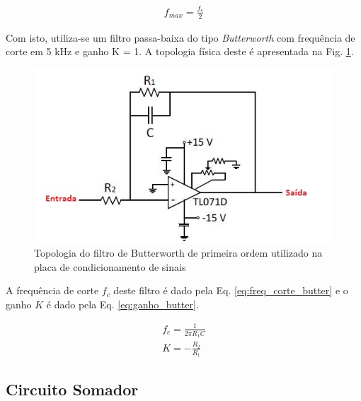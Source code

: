 	\begin{align}
		f_{max} = \frac{f_s}{2}\label{eq:freq_sinal}
	\end{align}

	Com isto, utiliza-se um filtro passa-baixa do tipo \textit{Butterworth} com frequência de corte em 5 kHz e ganho K = 1. A topologia física deste é apresentada na Fig. \ref{fig:filtro-butter}.
	
\begin{figure}[!hbt]
         \begin{center}
         \includegraphics[scale=0.7]{figuras/filtro-butter.JPG}
         \caption{Topologia do filtro de Butterworth de primeira ordem utilizado na placa de condicionamento de sinais}
         \label{fig:filtro-butter}
         \end{center}
 \end{figure}

	A frequência de corte $f_c$ deste filtro é dado pela Eq. \ref{eq:freq_corte_butter} e o ganho $K$ é dado pela Eq. \ref{eq:ganho_butter}.
	
\begin{align}
	f_{c} = \frac{1}{2\pi R_1 C} \label{eq:freq_corte_butter} \\
	K = -\frac{R_2}{R_1}\label{eq:ganho_butter}
\end{align}

\subsection{Circuito Somador}

